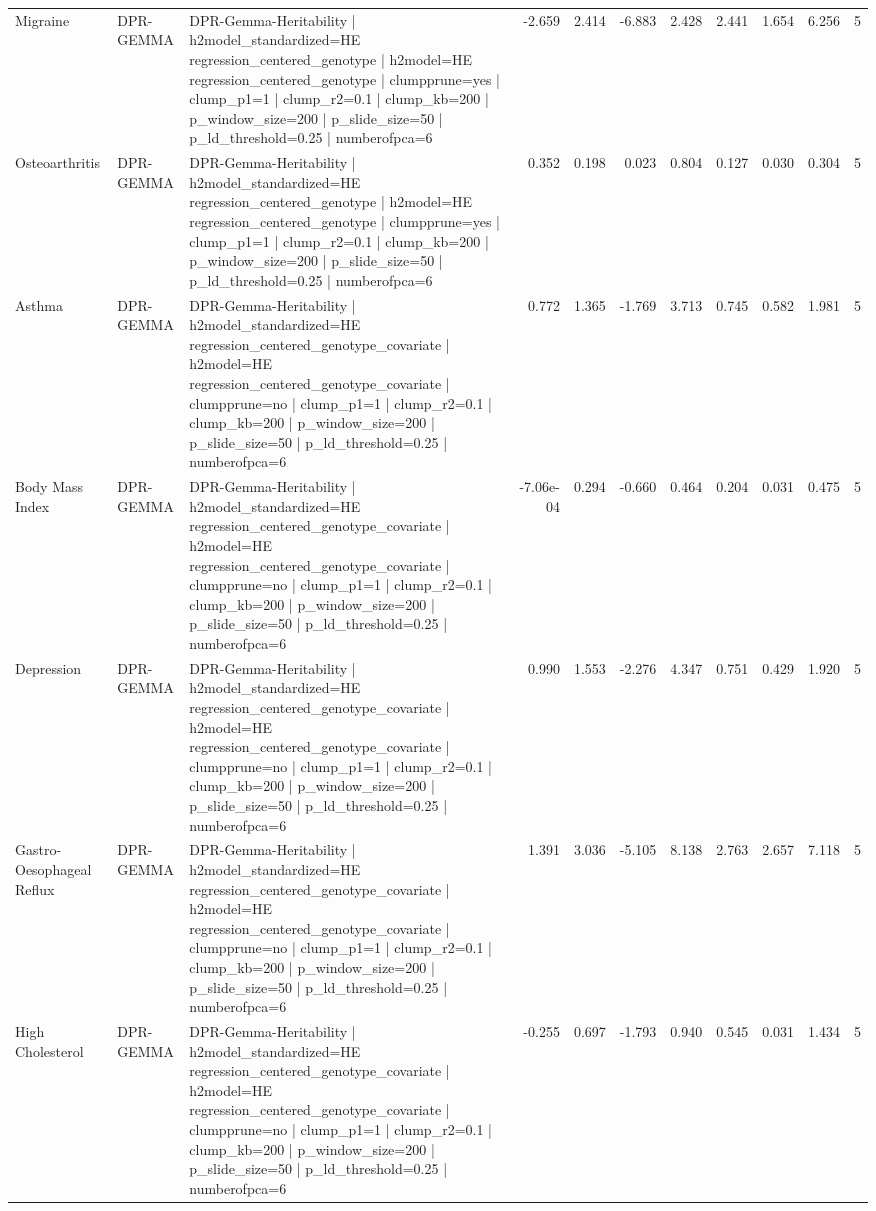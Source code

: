 \begin{landscape}
\begin{longtable}{p{2.4cm}p{1.8cm}p{6.0cm}rrrrrrrr}
Migraine & DPR-GEMMA & DPR-Gemma-Heritability | h2model\_standardized=HE regression\_centered\_genotype | h2model=HE regression\_centered\_genotype | clumpprune=yes | clump\_p1=1 | clump\_r2=0.1 | clump\_kb=200 | p\_window\_size=200 | p\_slide\_size=50 | p\_ld\_threshold=0.25 | numberofpca=6 & -2.659 & 2.414 & -6.883 & 2.428 & 2.441 & 1.654 & 6.256 & 5 \\
Osteoarthritis & DPR-GEMMA & DPR-Gemma-Heritability | h2model\_standardized=HE regression\_centered\_genotype | h2model=HE regression\_centered\_genotype | clumpprune=yes | clump\_p1=1 | clump\_r2=0.1 | clump\_kb=200 | p\_window\_size=200 | p\_slide\_size=50 | p\_ld\_threshold=0.25 | numberofpca=6 & 0.352 & 0.198 & 0.023 & 0.804 & 0.127 & 0.030 & 0.304 & 5 \\
Asthma & DPR-GEMMA & DPR-Gemma-Heritability | h2model\_standardized=HE regression\_centered\_genotype\_covariate | h2model=HE regression\_centered\_genotype\_covariate | clumpprune=no | clump\_p1=1 | clump\_r2=0.1 | clump\_kb=200 | p\_window\_size=200 | p\_slide\_size=50 | p\_ld\_threshold=0.25 | numberofpca=6 & 0.772 & 1.365 & -1.769 & 3.713 & 0.745 & 0.582 & 1.981 & 5 \\
Body Mass Index & DPR-GEMMA & DPR-Gemma-Heritability | h2model\_standardized=HE regression\_centered\_genotype\_covariate | h2model=HE regression\_centered\_genotype\_covariate | clumpprune=no | clump\_p1=1 | clump\_r2=0.1 | clump\_kb=200 | p\_window\_size=200 | p\_slide\_size=50 | p\_ld\_threshold=0.25 | numberofpca=6 & -7.06e-04 & 0.294 & -0.660 & 0.464 & 0.204 & 0.031 & 0.475 & 5 \\
Depression & DPR-GEMMA & DPR-Gemma-Heritability | h2model\_standardized=HE regression\_centered\_genotype\_covariate | h2model=HE regression\_centered\_genotype\_covariate | clumpprune=no | clump\_p1=1 | clump\_r2=0.1 | clump\_kb=200 | p\_window\_size=200 | p\_slide\_size=50 | p\_ld\_threshold=0.25 | numberofpca=6 & 0.990 & 1.553 & -2.276 & 4.347 & 0.751 & 0.429 & 1.920 & 5 \\
Gastro-Oesophageal Reflux & DPR-GEMMA & DPR-Gemma-Heritability | h2model\_standardized=HE regression\_centered\_genotype\_covariate | h2model=HE regression\_centered\_genotype\_covariate | clumpprune=no | clump\_p1=1 | clump\_r2=0.1 | clump\_kb=200 | p\_window\_size=200 | p\_slide\_size=50 | p\_ld\_threshold=0.25 | numberofpca=6 & 1.391 & 3.036 & -5.105 & 8.138 & 2.763 & 2.657 & 7.118 & 5 \\
High Cholesterol & DPR-GEMMA & DPR-Gemma-Heritability | h2model\_standardized=HE regression\_centered\_genotype\_covariate | h2model=HE regression\_centered\_genotype\_covariate | clumpprune=no | clump\_p1=1 | clump\_r2=0.1 | clump\_kb=200 | p\_window\_size=200 | p\_slide\_size=50 | p\_ld\_threshold=0.25 | numberofpca=6 & -0.255 & 0.697 & -1.793 & 0.940 & 0.545 & 0.031 & 1.434 & 5 \\

\end{longtable}
\end{landscape}
